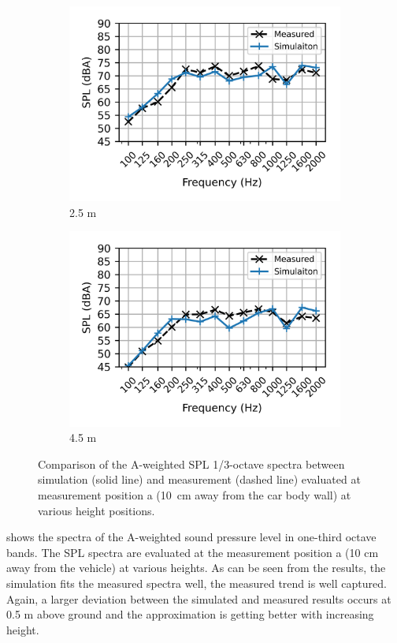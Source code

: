 \begin{figure}
\begin{subfigure}[b]{0.49\textwidth}
		\centering
		\includegraphics{fig/chap5/initial_model/freq_spectrum/pos_10cm_2pt5m.png}
		\caption{2.5 m}
	\end{subfigure}
	\hfill
	\begin{subfigure}[b]{0.49\textwidth}
		\centering
		\includegraphics{fig/chap5/initial_model/freq_spectrum/pos_10cm_4pt5m.png}
		\caption{4.5 m}
	\end{subfigure}
	\caption{Comparison of the A-weighted SPL 1/3-octave spectra between simulation (solid line) and measurement (dashed line) evaluated at measurement position a (\SI{10}{\centi\meter} away from the car body wall) at various height positions.}
	\label{fig:freq_spectrum}
\end{figure}
%
 shows the spectra of the A-weighted sound pressure level in one-third octave bands. The SPL spectra are evaluated at the measurement position a (10 cm away from the vehicle) at various heights. As can be seen from the results, the simulation fits the measured spectra well, the measured trend is well captured. Again, a larger deviation between the simulated and measured results occurs at 0.5 m above ground and the approximation is getting better with increasing height.

